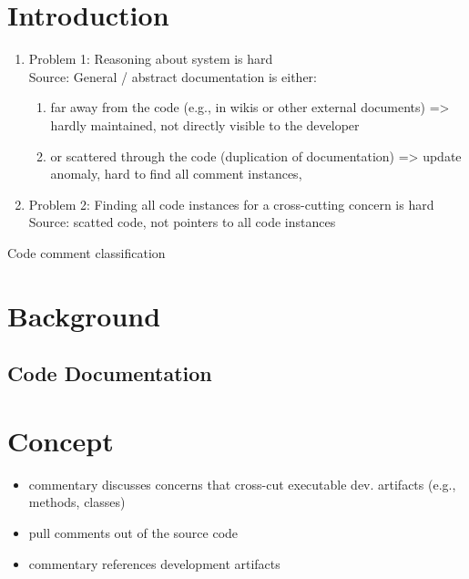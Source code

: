 
\section{Introduction}
\begin{enumerate}
	
\item  Problem 1: Reasoning about system is hard\\
Source: General / abstract documentation is either:
\begin{enumerate}
	\item far away from the code (e.g., in wikis or other external documents) => hardly maintained, not directly visible to the developer
	\item or scattered through the code (duplication of documentation) => update anomaly, hard to find all comment instances, 
\end{enumerate}

\item  Problem 2: Finding all code instances for a cross-cutting concern is hard\\
Source: scatted code, not pointers to all code instances

\end{enumerate}


Code comment classification\cite{Pascarella2017ClassifyingCodeComments} 
\section{Background}

\subsection{Code Documentation}

\section{Concept}

\begin{itemize}
\item commentary discusses concerns that cross-cut executable dev. artifacts (e.g., methods, classes)
\item pull comments out of the source code 
\item commentary references development artifacts 
\end{itemize}

